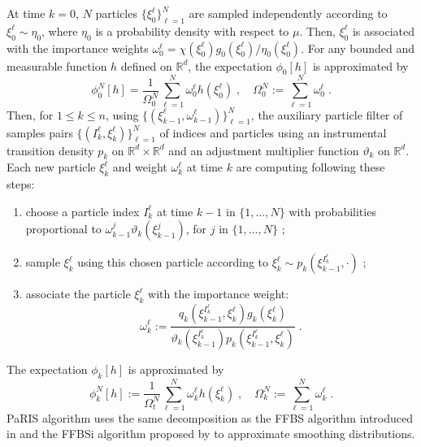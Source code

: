 \documentclass[12pt]{article}
\newcommand{\eqsp}{\;}
\newcommand{\1}{\mathrm{1}}
\newcommand{\qk}{q_{k}}
\begin{document}
At time $k = 0$, $N$ particles $\{\xi^{\ell}_0\}_{\ell=1}^N$ are sampled independently according to  $\xi^{\ell}_0 \sim \eta_0$, where $\eta_0$ is a probability density with respect to $\mu$. 
Then, $\xi^{\ell}_0$ is associated with the importance weights $\omega_0^{\ell} = \chi(\xi^{\ell}_0)g_0 (\xi^{\ell}_0)/\eta_0(\xi^{\ell}_0)$. 
For any bounded and measurable function $h$ defined on $\mathbb{R}^d$, the expectation $\phi_{0}[h] $ is approximated by
\[
\phi^N_{0}[h] = \frac{1}{\Omega_0^N} \sum_{\ell=1}^N \omega_0^{\ell} h \left(\xi^{\ell}_0 \right)\eqsp, \quad \Omega_0^N:= \sum_{\ell=1}^N \omega_0^{\ell}\eqsp.
\]
Then, for $1\le k \le n$, using $\{(\xi^{\ell}_{k-1},\omega^{\ell}_{k-1})\}_{\ell=1}^N$, the auxiliary particle filter of \cite{pitt:shephard:1999} samples pairs $\{(I^{\ell}_k,\xi^{\ell}_{k})\}_{\ell=1}^N$ of indices and particles using an instrumental transition density $p_k$ on $\mathbb{R}^d\times \mathbb{R}^d$ and an adjustment multiplier function $\vartheta_k$ on $\mathbb{R}^d$. Each new particle $\xi^{\ell}_{k}$ and weight $\omega^{\ell}_k$ at time $k$ are computing following these steps:
\begin{enumerate}[-]
\item choose a particle index $I^{\ell}_k$ at time $k-1$ in $\{1,\ldots,N\}$ with probabilities proportional to $\omega_{k-1}^{j} \vartheta_k (\xi^{j}_{k-1})$, for $j$ in $\{1,\ldots,N\}$ ;
\item sample  $\xi^{\ell}_{k}$ using this chosen particle according to $\xi^{\ell}_{k} \sim p_k(\xi^{I^{\ell}_k}_{k-1},\cdot)$ ; 
\item  associate the particle $\xi^{\ell}_k$ with the importance weight:
\begin{equation}
\label{eq:importance:weights}
\omega^{\ell}_k := \frac{\qk(\xi_{k-1}^{I^{\ell}_k},\xi^{\ell}_k)g_k(\xi^{\ell}_k)}{\vartheta_k(\xi^{I^{\ell}_k}_{k-1}) p_k (\xi_{k-1}^{I^{\ell}_k},\xi^{\ell}_k)}\eqsp.
\end{equation}
\end{enumerate} 
The expectation $\phi_{k}[h]$ is approximated by
\[
\phi^N_{k}[h] := \frac{1}{\Omega_t^N} \sum_{\ell=1}^N \omega_k^{\ell} h \left(\xi^{\ell}_k \right)\eqsp,\quad\Omega_k^N:= \sum_{\ell=1}^N \omega_k^{\ell}\eqsp.
\]
PaRIS algorithm uses the same decomposition as the FFBS algorithm introduced in \cite{doucetgodsillandrieu:2000} and the FFBSi algorithm proposed by \cite{godsill:doucet:west:2004} to approximate smoothing distributions. 
\end{document}
